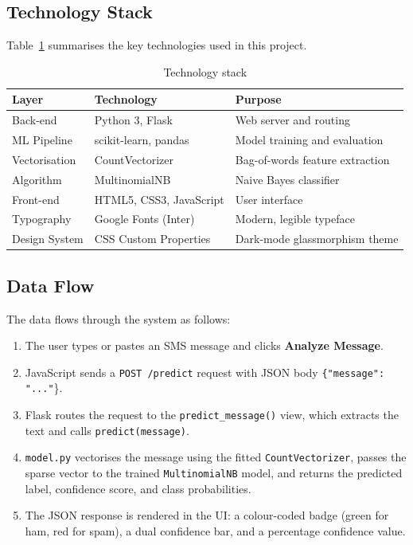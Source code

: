 \documentclass[paper=a4, fontsize=11pt]{scrartcl}
\numberwithin{equation}{section}
\numberwithin{figure}{section}
\numberwithin{table}{section}
\begin{document}
\subsection{Technology Stack}
Table~\ref{tab:techstack} summarises the key technologies used in this project.

\begin{table}[h]
\centering
\caption{Technology stack}
\label{tab:techstack}
\begin{tabular}{@{} l l l @{}}
\toprule
\textbf{Layer} & \textbf{Technology} & \textbf{Purpose} \\
\midrule
Back-end      & Python 3, Flask        & Web server and routing \\
ML Pipeline   & scikit-learn, pandas   & Model training and evaluation \\
Vectorisation & CountVectorizer        & Bag-of-words feature extraction \\
Algorithm     & MultinomialNB          & Naive Bayes classifier \\
Front-end     & HTML5, CSS3, JavaScript & User interface \\
Typography    & Google Fonts (Inter)   & Modern, legible typeface \\
Design System & CSS Custom Properties  & Dark-mode glassmorphism theme \\
\bottomrule
\end{tabular}
\end{table}

\subsection{Data Flow}
The data flows through the system as follows:
\begin{enumerate}
    \item The user types or pastes an SMS message and clicks \textbf{Analyze Message}.
    \item JavaScript sends a \texttt{POST /predict} request with JSON body \texttt{\{"message": "..."}\}.
    \item Flask routes the request to the \texttt{predict\_message()} view, which extracts the text and calls \texttt{predict(message)}.
    \item \texttt{model.py} vectorises the message using the fitted \texttt{CountVectorizer}, passes the sparse vector to the trained \texttt{MultinomialNB} model, and returns the predicted label, confidence score, and class probabilities.
    \item The JSON response is rendered in the UI: a colour-coded badge (green for ham, red for spam), a dual confidence bar, and a percentage confidence value.
\end{enumerate}
\end{document}
